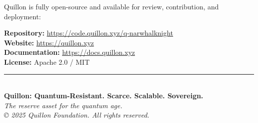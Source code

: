 \documentclass[11pt,a4paper]{scrartcl}
\begin{document}
Quillon is fully open-source and available for review, contribution, and deployment:

\begin{center}
\textbf{Repository:} \url{https://code.quillon.xyz/q-narwhalknight}\\
\textbf{Website:} \url{https://quillon.xyz}\\
\textbf{Documentation:} \url{https://docs.quillon.xyz}\\
\textbf{License:} Apache 2.0 / MIT
\end{center}

\vspace{2em}

\begin{center}
\rule{\textwidth}{0.4pt}\\[1em]
{\large\textbf{Quillon: Quantum-Resistant. Scarce. Scalable. Sovereign.}}\\[1em]
\textit{The reserve asset for the quantum age.}\\[2em]
\textit{© 2025 Quillon Foundation. All rights reserved.}
\end{center}
\end{document}

